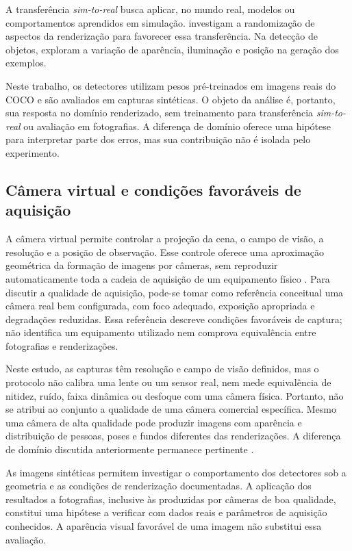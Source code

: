 A transferência \textit{sim-to-real} busca aplicar, no mundo real, modelos ou comportamentos aprendidos em simulação.  investigam a randomização de aspectos da renderização para favorecer essa transferência. Na detecção de objetos,  exploram a variação de aparência, iluminação e posição na geração dos exemplos.

Neste trabalho, os detectores utilizam pesos pré-treinados em imagens reais do COCO e são avaliados em capturas sintéticas. O objeto da análise é, portanto, sua resposta no domínio renderizado, sem treinamento para transferência \textit{sim-to-real} ou avaliação em fotografias. A diferença de domínio oferece uma hipótese para interpretar parte dos erros, mas sua contribuição não é isolada pelo experimento.

\subsection{Câmera virtual e condições favoráveis de aquisição}
\label{sec:camera-virtual-real}
A câmera virtual permite controlar a projeção da cena, o campo de visão, a resolução e a posição de observação. Esse controle oferece uma aproximação geométrica da formação de imagens por câmeras, sem reproduzir automaticamente toda a cadeia de aquisição de um equipamento físico \cite{szeliski2010}. Para discutir a qualidade de aquisição, pode-se tomar como referência conceitual uma câmera real bem configurada, com foco adequado, exposição apropriada e degradações reduzidas. Essa referência descreve condições favoráveis de captura; não identifica um equipamento utilizado nem comprova equivalência entre fotografias e renderizações.

Neste estudo, as capturas têm resolução e campo de visão definidos, mas o protocolo não calibra uma lente ou um sensor real, nem mede equivalência de nitidez, ruído, faixa dinâmica ou desfoque com uma câmera física. Portanto, não se atribui ao conjunto a qualidade de uma câmera comercial específica. Mesmo uma câmera de alta qualidade pode produzir imagens com aparência e distribuição de pessoas, poses e fundos diferentes das renderizações. A diferença de domínio discutida anteriormente permanece pertinente \cite{tobin2017domain,tremblay2018synthetic}.

As imagens sintéticas permitem investigar o comportamento dos detectores sob a geometria e as condições de renderização documentadas. A aplicação dos resultados a fotografias, inclusive às produzidas por câmeras de boa qualidade, constitui uma hipótese a verificar com dados reais e parâmetros de aquisição conhecidos. A aparência visual favorável de uma imagem não substitui essa avaliação.

